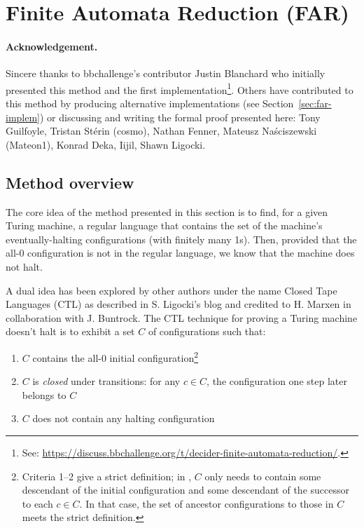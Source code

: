 
\newpage
\section{Finite Automata Reduction (FAR)}\label{sec:finite-automata-reduction}

\paragraph{Acknowledgement.} Sincere thanks to bbchallenge's contributor Justin Blanchard who initially presented this method and the first implementation\footnote{See: \url{https://discuss.bbchallenge.org/t/decider-finite-automata-reduction/}.}. Others have contributed to this method by producing alternative implementations (see Section~\ref{sec:far-implem}) or discussing and writing the formal proof presented here: Tony Guilfoyle, Tristan Stérin (cosmo), Nathan Fenner, Mateusz Naściszewski (Mateon1), Konrad Deka, Iijil, Shawn Ligocki. %


\subsection{Method overview}\label{far-overview}

The core idea of the method presented in this section is to find, for a given Turing machine, a regular language that contains the set of the machine's eventually-halting configurations (with finitely many 1s). Then, provided that the all-0 configuration is not in the regular language, we know that the machine does not halt.

A dual idea has been explored by other authors under the name Closed Tape Languages (CTL) as described in S. Ligocki's blog \cite{ShawnCTL} and credited to H. Marxen in collaboration with J. Buntrock.
The CTL technique for proving a Turing machine doesn't halt is to exhibit a set $C$ of configurations such that:

\begin{enumerate}
  \item $C$ contains the all-0 initial configuration\footnote{
          Criteria 1--2 give a strict definition; in \cite{ShawnCTL}, $C$ only needs to contain some descendant of the initial configuration and some descendant of the successor to each $c\in C$.
          In that case, the set of ancestor configurations to those in $C$ meets the strict definition.
        }
  \item $C$ is \textit{closed} under transitions: for any $c \in C$, the configuration one step later belongs to $C$\addtocounter{footnote}{-1}\addtocounter{Hfootnote}{-1}\footnotemark
  \item $C$ does not contain any halting configuration
\end{enumerate}


